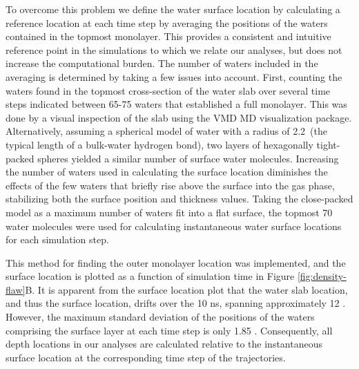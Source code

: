 	To overcome this problem we define the water surface location by calculating a reference location at each time step by averaging the positions of the waters contained in the topmost monolayer. This provides a consistent and intuitive reference point in the simulations to which we relate our analyses, but does not increase the computational burden. The number of waters included in the averaging is determined by taking a few issues into account. First, counting the waters found in the topmost cross-section of the water slab over several time steps indicated between 65-75 waters that established a full monolayer. This was done by a visual inspection of the slab using the VMD MD visualization package.\cite{Humphrey1996} Alternatively, assuming a spherical model of water with a radius of 2.2\angs~(the typical length of a bulk-water hydrogen bond), two layers of hexagonally tight-packed spheres yielded a similar number of surface water molecules. Increasing the number of waters used in calculating the surface location diminishes the effects of the few waters that briefly rise above the surface into the gas phase, stabilizing both the surface position and thickness values. Taking the close-packed model as a maximum number of waters fit into a flat surface, the topmost 70 water molecules were used for calculating instantaneous water surface locations for each simulation step. 
  
This method for finding the outer monolayer location was implemented, and the surface location is plotted as a function of simulation time in Figure \ref{fig:density-flaw}B. It is apparent from the surface location plot that the water slab location, and thus the surface location, drifts over the 10 ns, spanning approximately 12 \angs. However, the maximum standard deviation of the positions of the waters comprising the surface layer at each time step is only 1.85 \angs. Consequently, all depth locations in our analyses are calculated relative to the instantaneous surface location at the corresponding time step of the trajectories.

